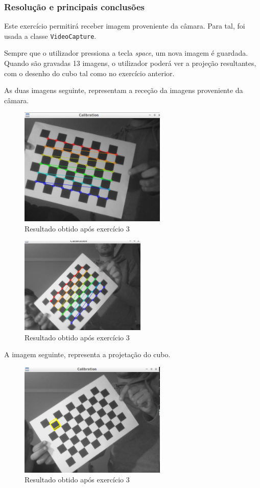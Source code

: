 \documentclass[portuguese, times, mirror]{revdetua}
\begin{document}
\subsubsection{Resolução e principais conclusões}


Este exercício permitirá receber imagem proveniente da câmara. Para tal, foi usada a classe \texttt{VideoCapture}. 

Sempre que o utilizador pressiona a tecla \textit{space}, um nova imagem é guardada. Quando são gravadas 13 imagens, o utilizador poderá ver a projeção resultantes, com o desenho do cubo tal como no exercício anterior. 

As duas imagens seguinte, representam a receção da imagens proveniente da câmara. 

\begin{figure}[ht!]
\centering
\includegraphics[width=70mm]{img/ex3_in.png}
\caption{Resultado obtido após exercício 3}
\end{figure}

\begin{figure}[ht!]
\centering
\includegraphics[width=60mm]{img/ex3_in2.png}
\caption{Resultado obtido após exercício 3}
\end{figure}

\newpage
A imagem seguinte, representa a projetação do cubo. 

\begin{figure}[ht!]
\centering
\includegraphics[width=70mm]{img/ex3_r.png}
\caption{Resultado obtido após exercício 3}
\end{figure}
\end{document}
